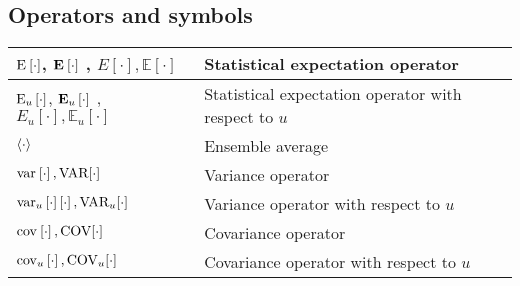 \documentclass{article}
\begin{document}
\subsection{Operators and symbols}
\begin{xltabular}{\textwidth}{XX}
	\(\E{\cdot}\), \(\nossekE{\cdot}\) \cite{nossekAdaptiveArraySignal2015}, \(E\left[ \cdot \right], \mathbb{E}\left[ \cdot \right]\)           & Statistical expectation operator \cite{dinizAdaptiveFilteringAlgorithms2002}                                                                                            \\ \hline
	\(\E[u]{\cdot}\), \(\nossekE[u]{\cdot}\) \cite{nossekAdaptiveArraySignal2015}, \(E_u\left[ \cdot \right], \mathbb{E}_u\left[ \cdot \right]\) & Statistical expectation operator with respect to \(u\)                                                                                                                  \\ \hline
	\(\expval{\cdot}\)                                                                                                                           & Ensemble average                                                                                                                                                        \\ \hline
	\(\var{\cdot}, \textnormal{VAR}[\cdot]\)                                                                                                     & Variance operator \cite{haykinAdaptiveFilterTheory2002,leon-garciaProbabilityStatisticsRandom2007,proakisDigitalCommunications2007,bishopPatternRecognitionMachine2006} \\ \hline
	\(\var[u]{\cdot} \left[ \cdot \right], \textnormal{VAR}_u[\cdot]\)                                                                           & Variance operator with respect to \(u\)                                                                                                                                 \\ \hline
	\(\cov{\cdot}, \textnormal{COV}[\cdot]\)                                                                                                     & Covariance operator \cite{bishopPatternRecognitionMachine2006}                                                                                                          \\ \hline
	\(\cov[u]{\cdot}, \textnormal{COV}_u[\cdot]\)                                                                                                & Covariance operator with respect to \(u\)                                                                                                                               \\ \hline

\end{xltabular}
\end{document}
